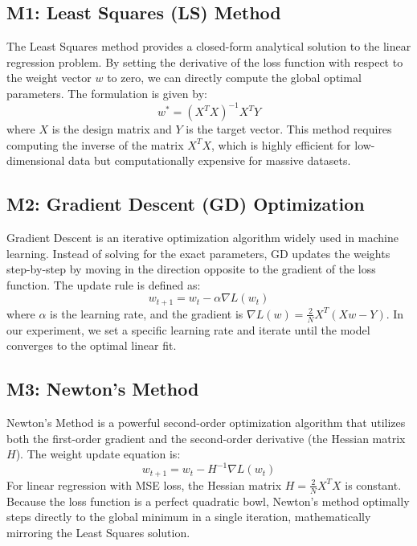 \documentclass[12pt,a4paper]{article}
\begin{document}
\subsection*{M1: Least Squares (LS) Method}
The Least Squares method provides a closed-form analytical solution to the linear regression problem. By setting the derivative of the loss function with respect to the weight vector $w$ to zero, we can directly compute the global optimal parameters. The formulation is given by:
\begin{equation}
    w^* = (X^T X)^{-1} X^T Y
\end{equation}
where $X$ is the design matrix and $Y$ is the target vector. This method requires computing the inverse of the matrix $X^T X$, which is highly efficient for low-dimensional data but computationally expensive for massive datasets.

\subsection*{M2: Gradient Descent (GD) Optimization}
Gradient Descent is an iterative optimization algorithm widely used in machine learning. Instead of solving for the exact parameters, GD updates the weights step-by-step by moving in the direction opposite to the gradient of the loss function. The update rule is defined as:
\begin{equation}
    w_{t+1} = w_t - \alpha \nabla L(w_t)
\end{equation}
where $\alpha$ is the learning rate, and the gradient is $\nabla L(w) = \frac{2}{N} X^T (Xw - Y)$. In our experiment, we set a specific learning rate and iterate until the model converges to the optimal linear fit.

\subsection*{M3: Newton's Method}
Newton's Method is a powerful second-order optimization algorithm that utilizes both the first-order gradient and the second-order derivative (the Hessian matrix $H$). The weight update equation is:
\begin{equation}
    w_{t+1} = w_t - H^{-1} \nabla L(w_t)
\end{equation}
For linear regression with MSE loss, the Hessian matrix $H = \frac{2}{N} X^T X$ is constant. Because the loss function is a perfect quadratic bowl, Newton's method optimally steps directly to the global minimum in a single iteration, mathematically mirroring the Least Squares solution.
\end{document}
